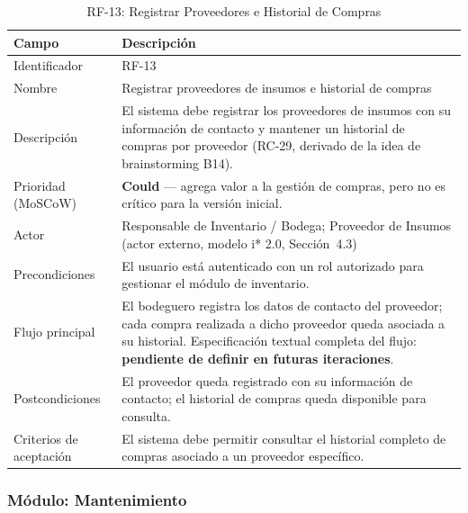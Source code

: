 \documentclass[12pt,a4paper]{article}
\begin{document}
\begin{table}[H]
\centering
\caption{RF-13: Registrar Proveedores e Historial de Compras}
\begin{tabular}{|p{3.6cm}|p{10.4cm}|}
\hline
\textbf{Campo} & \textbf{Descripción} \\
\hline
Identificador & RF-13 \\ \hline
Nombre & Registrar proveedores de insumos e historial de compras \\ \hline
Descripción & El sistema debe registrar los proveedores de insumos con su
información de contacto y mantener un historial de compras por proveedor
(RC-29, derivado de la idea de brainstorming B14). \\ \hline
Prioridad (MoSCoW) & \textbf{Could} --- agrega valor a la gestión de compras,
pero no es crítico para la versión inicial. \\ \hline
Actor & Responsable de Inventario / Bodega; Proveedor de Insumos (actor
externo, modelo i* 2.0, Sección~4.3) \\ \hline
Precondiciones & El usuario está autenticado con un rol autorizado para
gestionar el módulo de inventario. \\ \hline
Flujo principal & El bodeguero registra los datos de contacto del proveedor;
cada compra realizada a dicho proveedor queda asociada a su historial.
Especificación textual completa del flujo: \textbf{pendiente de definir en
futuras iteraciones}. \\ \hline
Postcondiciones & El proveedor queda registrado con su información de
contacto; el historial de compras queda disponible para consulta. \\ \hline
Criterios de aceptación & El sistema debe permitir consultar el historial
completo de compras asociado a un proveedor específico. \\ \hline
\end{tabular}
\end{table}

\subsubsection{Módulo: Mantenimiento}
\end{document}
